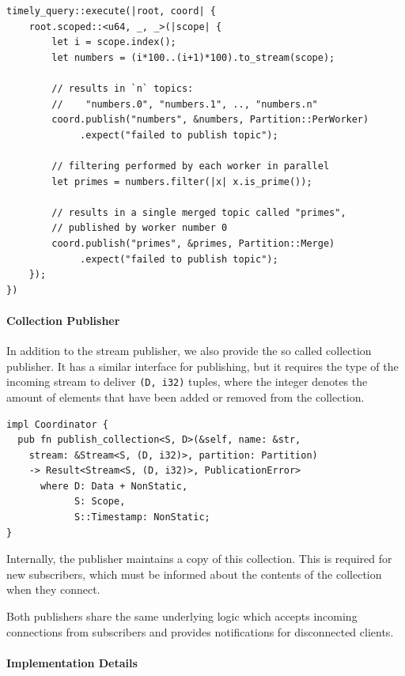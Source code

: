 \begin{lstlisting}[caption={
Example use of publisher.
}]
timely_query::execute(|root, coord| {
    root.scoped::<u64, _, _>(|scope| {
        let i = scope.index();
        let numbers = (i*100..(i+1)*100).to_stream(scope);

        // results in `n` topics:
        //    "numbers.0", "numbers.1", .., "numbers.n"
        coord.publish("numbers", &numbers, Partition::PerWorker)
             .expect("failed to publish topic");

        // filtering performed by each worker in parallel
        let primes = numbers.filter(|x| x.is_prime());

        // results in a single merged topic called "primes",
        // published by worker number 0
        coord.publish("primes", &primes, Partition::Merge)
             .expect("failed to publish topic");
    });
})
\end{lstlisting}


\paragraph{Collection Publisher}

In addition to the stream publisher, we also provide the so called collection
publisher. It has a similar interface for publishing, but it requires the
type of the incoming stream to deliver \lstinline{(D, i32)} tuples, where
the integer denotes the amount of elements that have been added or removed from
the collection.

\begin{lstlisting}[caption={[Collection publisher interface]
}]
impl Coordinator {
  pub fn publish_collection<S, D>(&self, name: &str,
    stream: &Stream<S, (D, i32)>, partition: Partition)
    -> Result<Stream<S, (D, i32)>, PublicationError>
      where D: Data + NonStatic, 
            S: Scope,
            S::Timestamp: NonStatic;
}
\end{lstlisting}

Internally, the publisher maintains a copy of this collection. This is required
for new subscribers, which must be informed about the contents of the collection
when they connect.

Both publishers share the same underlying logic which accepts incoming connections
from subscribers and provides notifications for disconnected clients.



\paragraph{Implementation Details}



